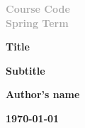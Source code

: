 \documentclass[../main.tex]{subfiles}
\begin{document}
  \raggedright
  \text{}\par\vspace{4cm}
    {\large\bfseries \textcolor{darkgray}{Course Code}}\\
    \vspace{2mm}
    {\large\bfseries \textcolor{darkgray}{Spring Term \the\year}}\\
    \vspace{1cm}

    {\LARGE\bfseries Title\par}\vspace{2mm}
    {\Large\bfseries Subtitle \par}

    \vspace{1cm}

    {\large\bfseries Author's name\par}
    \vspace{1cm}
    {\large\bfseries \today\par}
    \vfill
\end{document}
